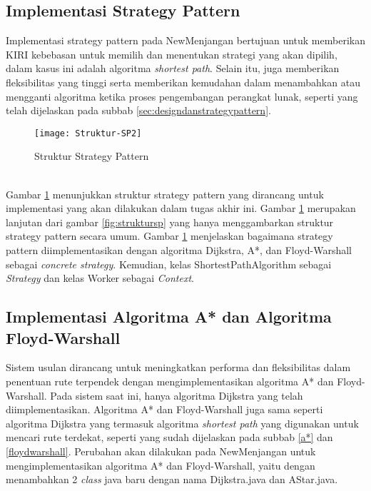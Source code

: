 \subsection{Implementasi Strategy Pattern}
Implementasi strategy pattern pada NewMenjangan bertujuan untuk memberikan KIRI kebebasan untuk memilih dan menentukan strategi yang akan dipilih, dalam kasus ini adalah algoritma \textit{shortest path}. Selain itu, juga memberikan fleksibilitas yang tinggi serta memberikan kemudahan dalam menambahkan atau mengganti algoritma ketika proses pengembangan perangkat lunak, seperti yang telah dijelaskan pada subbab \ref{sec:designdanstrategypattern}.
\begin{figure}[h] 
    \centering  
    \texttt{[image: Struktur-SP2]}  
    \caption{Struktur Strategy Pattern}
    \label{fig:struktursp2} 
\end{figure}
\\
Gambar \ref{fig:struktursp2} menunjukkan struktur strategy pattern yang dirancang untuk implementasi yang akan dilakukan dalam tugas akhir ini. Gambar \ref{fig:struktursp2} merupakan lanjutan dari gambar \ref{fig:struktursp} yang hanya menggambarkan struktur strategy pattern secara umum. Gambar \ref{fig:struktursp2} menjelaskan bagaimana strategy pattern diimplementasikan dengan algoritma Dijkstra, A*, dan Floyd-Warshall sebagai \textit{concrete strategy}. Kemudian, kelas ShortestPathAlgorithm sebagai \textit{Strategy} dan kelas Worker sebagai \textit{Context}.

\subsection{Implementasi Algoritma A* dan Algoritma Floyd-Warshall}
Sistem usulan dirancang untuk meningkatkan performa dan fleksibilitas dalam penentuan rute terpendek dengan mengimplementasikan algoritma A* dan Floyd-Warshall. Pada sistem saat ini, hanya algoritma Dijkstra yang telah diimplementasikan. Algoritma A* dan Floyd-Warshall juga sama seperti algoritma Dijkstra yang termasuk algoritma \textit{shortest path} yang digunakan untuk mencari rute terdekat, seperti yang sudah dijelaskan pada subbab \ref{a*} dan \ref{floydwarshall}. Perubahan akan dilakukan pada NewMenjangan untuk mengimplementasikan algoritma A* dan Floyd-Warshall, yaitu dengan menambahkan 2 \textit{class} java baru dengan nama Dijkstra.java dan AStar.java.

